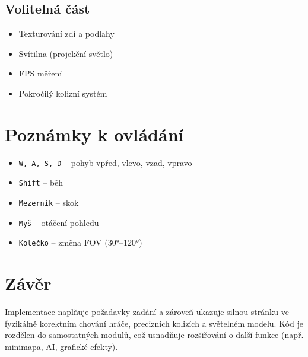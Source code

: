 \documentclass[12pt,a4paper]{article}
\begin{document}
\subsection*{Volitelná část}
\begin{itemize}
    \item Texturování zdí a podlahy
    \item Svítilna (projekční světlo)
    \item FPS měření
    \item Pokročilý kolizní systém
\end{itemize}

\section{Poznámky k ovládání}
\begin{itemize}
    \item \texttt{W, A, S, D} – pohyb vpřed, vlevo, vzad, vpravo
    \item \texttt{Shift} – běh
    \item \texttt{Mezerník} – skok
    \item \texttt{Myš} – otáčení pohledu
    \item \texttt{Kolečko} – změna FOV (30°–120°)
\end{itemize}

\section{Závěr}
Implementace naplňuje požadavky zadání a zároveň ukazuje silnou stránku ve fyzikálně korektním chování hráče, precizních kolizích a světelném modelu. Kód je rozdělen do samostatných modulů, což usnadňuje rozšiřování o další funkce (např. minimapa, AI, grafické efekty).
\end{document}
